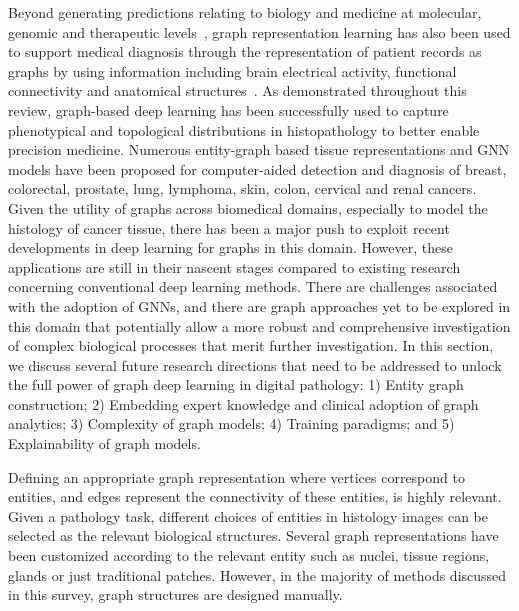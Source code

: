 \label{sec:sec4}
Beyond generating predictions relating to biology and medicine at molecular, genomic and therapeutic levels~, graph representation learning has also been used to support medical diagnosis through the representation of patient records as graphs by using information including brain electrical activity, functional connectivity and anatomical structures~. 
As demonstrated throughout this review, graph-based deep learning has been successfully used to capture phenotypical and topological distributions in histopathology to better enable precision medicine. Numerous entity-graph based tissue representations and GNN models have been proposed for computer-aided detection and diagnosis of breast, colorectal, prostate, lung, lymphoma, skin, colon, cervical and renal cancers.
Given the utility of graphs across biomedical domains, especially to model the histology of cancer tissue, there has been a major push to exploit recent developments in deep learning for graphs in this domain. However, these applications are still in their nascent stages compared to existing research concerning conventional deep learning methods. There are challenges associated with the adoption of GNNs, and there are graph approaches yet to be explored in this domain that potentially allow a more robust and comprehensive investigation of complex biological processes that merit further investigation.
In this section, we discuss several future research directions that need to be addressed to unlock the full power of graph deep learning in digital pathology: 
1) Entity graph construction;
2) Embedding expert knowledge and clinical adoption of graph  analytics;
3) Complexity of graph models;
4) Training paradigms; and
5) Explainability of graph models.
\vspace{-6pt}

\label{subsec:sec4a}
Defining an appropriate graph representation where vertices correspond to entities, and edges represent the connectivity of these entities, is highly relevant. 
Given a pathology task, different choices of entities in histology images can be selected as the relevant biological structures.
Several graph representations have been customized according to the relevant entity such as nuclei, tissue regions, glands or just traditional patches. However, in the majority of methods discussed in this survey, graph structures are designed manually.



